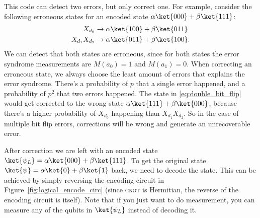 \documentclass[11pt, notitlepage]{report}
\begin{document}
This code can detect two errors, but only correct one. For example, consider the following erroneous states for an encoded state $\alpha\ket{000} + \beta\ket{111}$:
\begin{align}
  X_{d_0} &\rightarrow \alpha\ket{100} + \beta\ket{011} \label{eq:single_bit_flip} \\
  X_{d_1}X_{d_2} &\rightarrow \alpha\ket{011} + \beta\ket{100}. \label{eq:double_bit_flip}
\end{align}
We can detect that both states are erroneous, since for both states the error syndrome measurements are $M(a_0) = 1$ and $M(a_1) = 0$. When correcting an erroneous state, we always choose the least amount of errors that explains the error syndrome. There's a probability of $p$ that a single error happened, and a probability of $p^2$ that two errors happened. The state in \ref{eq:double_bit_flip} would get corrected to the wrong state $\alpha\ket{111} + \beta\ket{000}$, because there's a higher probability of $X_{d_0}$ happening than $X_{d_1}X_{d_2}$. So in the case of multiple bit flip errors, corrections will be wrong and generate an unrecoverable error.

After correction we are left with an encoded state $\ket{\psi_L} = \alpha\ket{000} + \beta\ket{111}$. To get the original state $\ket{\psi} = \alpha\ket{0} + \beta\ket{1}$ back, we need to decode the state. This can be achieved by simply reversing the encoding circuit in Figure~\ref{fig:logical_encode_circ} (since \textsc{cnot} is Hermitian, the reverse of the encoding circuit is itself). Note that if you just want to do measurement, you can measure any of the qubits in $\ket{\psi_L}$ instead of decoding it.
\end{document}
